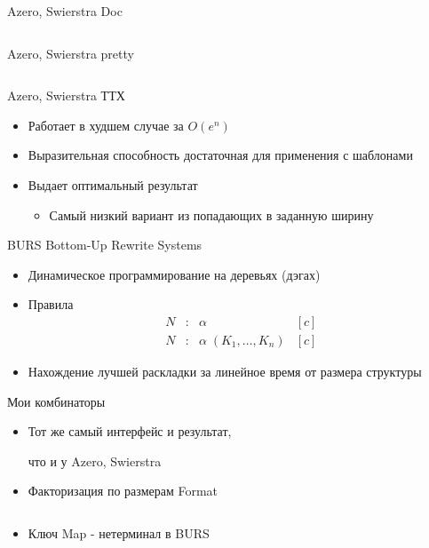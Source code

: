 \documentclass[sans]{beamer}
\begin{document}
\begin{frame}{Azero, Swierstra Doc}
  \inputminted{hs}{codes/swierstraDoc.hs}
\end{frame}

\begin{frame}{Azero, Swierstra pretty}
  \inputminted{hs}{codes/swierstraPretty.hs}
\end{frame}

\begin{frame}{Azero, Swierstra ТТХ}
  \begin{itemize}
    \item Работает в худшем случае за $O(e ^ n)$
    \item Выразительная способность достаточная для применения с шаблонами 
    \item Выдает оптимальный результат
    \begin{itemize}
      \item Самый низкий вариант из попадающих в заданную ширину
    \end{itemize}
  \end{itemize}
\end{frame}

\begin{frame}{BURS}
  Bottom-Up Rewrite Systems

  \begin{itemize}
    \item Динамическое программирование на деревьях (дэгах)
    \item Правила
    $$
    \begin{array}{rcll}

      N &:& \alpha& [c]\\
      N &:& \alpha\; (K_1,\dots,K_n)& [c]
    \end{array}
    $$
    \item Нахождение лучшей раскладки за линейное время от размера структуры
  \end{itemize}

\end{frame}

\begin{frame}{Мои комбинаторы}
  \begin{itemize}
    \item Тот же самый интерфейс и результат,
      
      что и у Azero, Swierstra
    \item Факторизация по размерам Format
      \inputminted{hs}{codes/myCombFS.hs}
    \item Ключ Map - нетерминал в BURS
  \end{itemize}
\end{frame}
\end{document}
